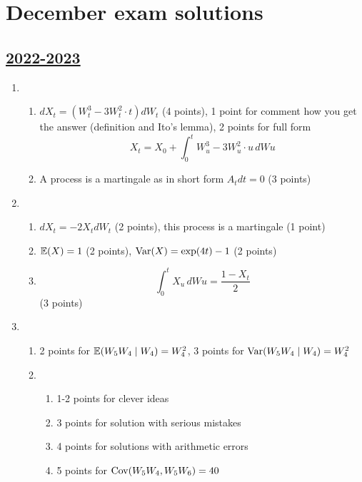 
\newpage
\thispagestyle{empty}
\section{December exam solutions}
\subsection[2022-2023]{\hyperref[sec:kr_02_2022_2023]{2022-2023}}
\label{sec:sol_kr_02_2022_2023} %

\begin{enumerate}
\item 
\begin{enumerate}
    \item $dX_t = (W^3_t-3W^2_t\cdot t)dW_t$ (4 points), 1 point for comment how you get the answer (definition and Ito's lemma), 2 points for full form 
    \[ 
    X_t = X_0 + \int_{0}^{t} W^3_u-3W^2_u\cdot u \,dWu
    \]
    \item A process is a martingale as in short form $A_t dt =0$ (3 points)
\end{enumerate}

\item 
\begin{enumerate}
    \item $dX_t=-2X_t dW_t$ (2 points), this process is a martingale (1 point)
    \item $\operatorname{\mathbb{E}}(X)=1$ (2 points), $\operatorname{Var}(X)=\exp(4t)-1$ (2 points)
    \item \[ \int_{0}^{t} X_u\,dWu = \frac{1-X_t}{2}\] (3 points)
\end{enumerate}

\item \begin{enumerate}
    \item 2 points for $\operatorname{\mathbb{E}}(W_5 W_4 \mid W_4) = W_4^2$, 3 points for $\operatorname{Var}(W_5 W_4 \mid W_4) = W_4^2$
    \item \begin{enumerate}
        \item 1-2 points for clever ideas
        \item 3 points for solution with serious mistakes
        \item 4 points for solutions with arithmetic errors
        \item 5 points for $\operatorname{Cov}(W_5 W_4, W_5 W_6) = 40$
    \end{enumerate}
\end{enumerate}


\end{enumerate}
